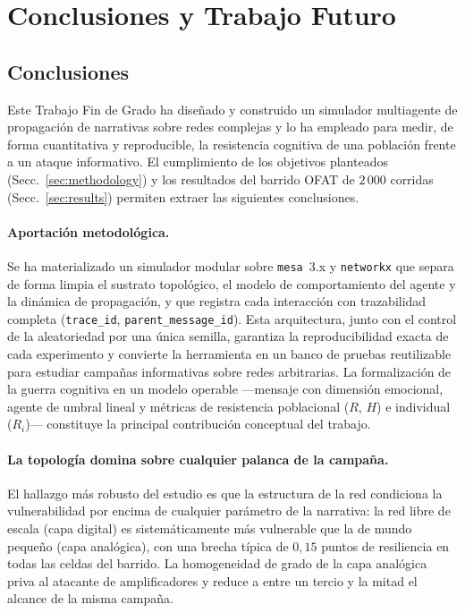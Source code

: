 \documentclass[12pt]{extarticle}
\numberwithin{equation}{section}
\begin{document}
\newpage

\section{Conclusiones y Trabajo Futuro}\label{sec:conclusion}

\subsection{Conclusiones}

Este Trabajo Fin de Grado ha diseñado y construido un simulador multiagente de propagación de narrativas sobre redes complejas y lo ha empleado para medir, de forma cuantitativa y reproducible, la resistencia cognitiva de una población frente a un ataque informativo. El cumplimiento de los objetivos planteados (Secc.~\ref{sec:methodology}) y los resultados del barrido OFAT de $2\,000$ corridas (Secc.~\ref{sec:results}) permiten extraer las siguientes conclusiones.

\paragraph{Aportación metodológica.} Se ha materializado un simulador modular sobre \texttt{mesa}~3.x y \texttt{networkx} que separa de forma limpia el sustrato topológico, el modelo de comportamiento del agente y la dinámica de propagación, y que registra cada interacción con trazabilidad completa (\texttt{trace\_id}, \texttt{parent\_message\_id}). Esta arquitectura, junto con el control de la aleatoriedad por una única semilla, garantiza la reproducibilidad exacta de cada experimento y convierte la herramienta en un banco de pruebas reutilizable para estudiar campañas informativas sobre redes arbitrarias. La formalización de la guerra cognitiva en un modelo operable —mensaje con dimensión emocional, agente de umbral lineal y métricas de resistencia poblacional ($R$, $H$) e individual ($R_i$)— constituye la principal contribución conceptual del trabajo.

\paragraph{La topología domina sobre cualquier palanca de la campaña.} El hallazgo más robusto del estudio es que la estructura de la red condiciona la vulnerabilidad por encima de cualquier parámetro de la narrativa: la red libre de escala (capa digital) es sistemáticamente más vulnerable que la de mundo pequeño (capa analógica), con una brecha típica de $0{,}15$ puntos de resiliencia en todas las celdas del barrido. La homogeneidad de grado de la capa analógica priva al atacante de amplificadores y reduce a entre un tercio y la mitad el alcance de la misma campaña.
\end{document}
